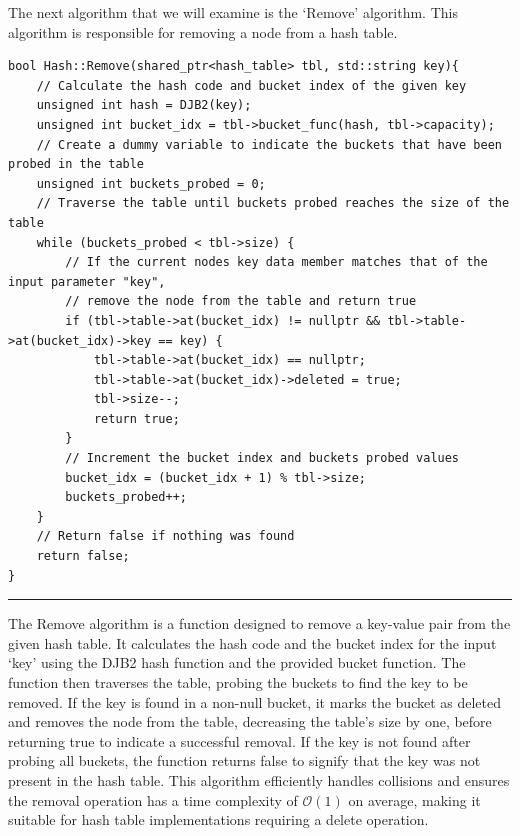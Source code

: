 \documentclass[a4paper,9pt]{article}
\newcommand{\horizontalline}{\noindent \rule{\textwidth}{0.5pt}\par}
\begin{document}
The next algorithm that we will examine is the `Remove' algorithm. This algorithm is responsible for removing a node from a hash table.

\begin{highlight}

\begin{verbatim}
bool Hash::Remove(shared_ptr<hash_table> tbl, std::string key){
    // Calculate the hash code and bucket index of the given key
    unsigned int hash = DJB2(key);
    unsigned int bucket_idx = tbl->bucket_func(hash, tbl->capacity);
    // Create a dummy variable to indicate the buckets that have been probed in the table
    unsigned int buckets_probed = 0;
    // Traverse the table until buckets probed reaches the size of the table
    while (buckets_probed < tbl->size) {
        // If the current nodes key data member matches that of the input parameter "key", 
        // remove the node from the table and return true
        if (tbl->table->at(bucket_idx) != nullptr && tbl->table->at(bucket_idx)->key == key) {
            tbl->table->at(bucket_idx) == nullptr;
            tbl->table->at(bucket_idx)->deleted = true;
            tbl->size--;
            return true;
        }
        // Increment the bucket index and buckets probed values
        bucket_idx = (bucket_idx + 1) % tbl->size;
        buckets_probed++;
    }
    // Return false if nothing was found
    return false;
}
\end{verbatim}

\horizontalline

The Remove algorithm is a function designed to remove a key-value pair from the given hash table. It calculates the hash code and the bucket index for the input `key' using the DJB2 hash function and 
the provided bucket function. The function then traverses the table, probing the buckets to find the key to be removed. If the key is found in a non-null bucket, it marks the bucket as deleted and removes 
the node from the table, decreasing the table's size by one, before returning true to indicate a successful removal. If the key is not found after probing all buckets, the function returns false to signify 
that the key was not present in the hash table. This algorithm efficiently handles collisions and ensures the removal operation has a time complexity of $\mathcal{O}(1)$ on average, making it suitable for 
hash table implementations requiring a delete operation.

\end{highlight}
\end{document}
